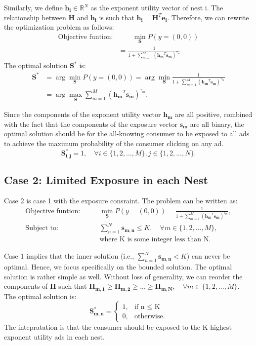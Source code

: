 \documentclass[12pt]{article}
\theoremstyle{definition}
\newcommand{\matr}[1]{\mathbf{#1}} %
\begin{document}
\begin{sloppypar}
Similarly, we define $\matr{h_i} \in \mathbb{R}^{N}$ as the exponent utility vector of nest i. The relationship between $\matr{H}$ and $\matr{h_i}$ is such that $\matr{h_i} = \matr{H}^T \matr{e_i}$.
Therefore, we can rewrite the optimization problem as follows:
\begin{align}
    \text{Objective funtion:} &\qquad \min_{\matr{S}} P(y=(0,0)) \nonumber \\
    &= \frac{1}{1+\sum_{m=1}^{M}(\matr{h_m}^T \matr{s_m})^{\tau_m}}
\end{align}
The optimal solution $\matr{S}^{\ast}$ is:
\begin{align}\label{optimal}
    \matr{S}^{\ast} &= \arg\min_{\matr{S}} P(y=(0,0)) = \arg\min_{\matr{S}} \frac{1}{1+\sum_{m=1}^{M}(\matr{h_m}^T \matr{s_m})^{\tau_m}} \nonumber \\
    &= \arg\max_{\matr{S}} \sum_{m=1}^{M}(\matr{h_m}^T \matr{s_m})^{\tau_m}.
\end{align}

Since the components of the exponent utility vector $\matr{h_m}$ are all positive, combined with the fact that the components of the exposure vector $\matr{s_m}$ are all binary, the optimal solution should be for the all-knowing consumer to be exposed to all ads to achieve the maximum probability of the consumer clicking on any ad.
\begin{equation}
    \matr{S^{\ast}_{i,j}} = 1, \quad \forall i \in \{1,2,...,M\}, j \in \{1,2,...,N\}.
\end{equation}

\subsection{Case 2: Limited Exposure in each Nest}
Case 2 is case 1 with the exposure consraint. The problem can be written as:
\begin{align} \label{case2}
    \text{Objective funtion:} \qquad &\min_{\matr{S}} P(y=(0,0)) = \frac{1}{1+\sum_{m=1}^{M}(\matr{h_m}^T \matr{s_m})^{\tau_m}},\nonumber \\
    \text{Subject to:} \qquad &\sum_{n=1}^{N}\matr{s_{m,n}} \leq K, \quad \forall m \in \{1,2,...,M\},\\ &\text{where K is some integer less than N}. \nonumber
\end{align}

Case 1 implies that the inner solution (i.e., $\sum_{n=1}^{N}\matr{s_{m,n}} < K$) can never be optimal. Hence, we focus specifically on the bounded solution. The optimal solution is rather simple as well.
Without loss of generality, we can reorder the components of $\matr{H}$ such that $\matr{H_{m,1}} \geq \matr{H_{m,2}} \geq ... \geq \matr{H_{m,N}}, \quad \forall m \in \{1,2,...,M\}$. The optimal solution is:
\begin{equation}
    \matr{S^{\ast}_{m,n}} = 
    \begin{cases}
        1, & \text{if n $\leq$ K} \\
        0, & \text{otherwise}.
    \end{cases}
\end{equation}
The intepratation is that the consumer should be exposed to the K highest exponent utility ads in each nest.


\end{sloppypar}
\end{document}
